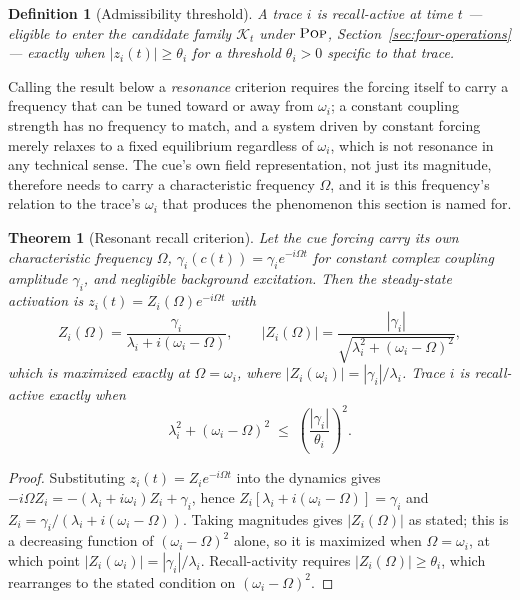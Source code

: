 \documentclass[11pt]{article}
\newcommand{\Pop}{\textsc{Pop}}
\newtheorem{definition}{Definition}
\newtheorem{theorem}{Theorem}
\begin{document}
\begin{definition}[Admissibility threshold]
A trace $i$ is \emph{recall-active} at time $t$ --- eligible to enter the candidate family $\mathcal{K}_t$ under $\Pop$, Section~\ref{sec:four-operations} --- exactly when $|z_i(t)|\geq\theta_i$ for a threshold $\theta_i>0$ specific to that trace.
\end{definition}

Calling the result below a \emph{resonance} criterion requires the forcing itself to carry a frequency that can be tuned toward or away from $\omega_i$; a constant coupling strength has no frequency to match, and a system driven by constant forcing merely relaxes to a fixed equilibrium regardless of $\omega_i$, which is not resonance in any technical sense. The cue's own field representation, not just its magnitude, therefore needs to carry a characteristic frequency $\Omega$, and it is this frequency's relation to the trace's $\omega_i$ that produces the phenomenon this section is named for.

\begin{theorem}[Resonant recall criterion]
\label{thm:recall}
Let the cue forcing carry its own characteristic frequency $\Omega$, $\gamma_i(c(t)) = \gamma_i e^{-i\Omega t}$ for constant complex coupling amplitude $\gamma_i$, and negligible background excitation. Then the steady-state activation is $z_i(t) = Z_i(\Omega)e^{-i\Omega t}$ with
\[
Z_i(\Omega) = \frac{\gamma_i}{\lambda_i + i(\omega_i-\Omega)}, \qquad |Z_i(\Omega)| = \frac{|\gamma_i|}{\sqrt{\lambda_i^2+(\omega_i-\Omega)^2}},
\]
which is maximized exactly at $\Omega=\omega_i$, where $|Z_i(\omega_i)|=|\gamma_i|/\lambda_i$. Trace $i$ is recall-active exactly when
\[
\lambda_i^2 + (\omega_i-\Omega)^2 \;\leq\; \left(\frac{|\gamma_i|}{\theta_i}\right)^2.
\]
\end{theorem}

\begin{proof}
Substituting $z_i(t)=Z_i e^{-i\Omega t}$ into the dynamics gives $-i\Omega Z_i = -(\lambda_i+i\omega_i)Z_i + \gamma_i$, hence $Z_i[\lambda_i+i(\omega_i-\Omega)]=\gamma_i$ and $Z_i=\gamma_i/(\lambda_i+i(\omega_i-\Omega))$. Taking magnitudes gives $|Z_i(\Omega)|$ as stated; this is a decreasing function of $(\omega_i-\Omega)^2$ alone, so it is maximized when $\Omega=\omega_i$, at which point $|Z_i(\omega_i)|=|\gamma_i|/\lambda_i$. Recall-activity requires $|Z_i(\Omega)|\geq\theta_i$, which rearranges to the stated condition on $(\omega_i-\Omega)^2$.
\end{proof}
\end{document}
